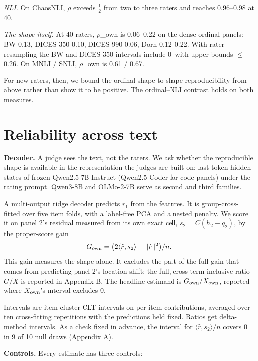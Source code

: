 \documentclass[10pt,twocolumn]{article}
\begin{document}
\emph{NLI.} On ChaosNLI, $\rho$ exceeds $\tfrac12$ from two to three raters and reaches 0.96--0.98 at 40.

\emph{The shape itself.} At 40 raters, $\rho$\_own is 0.06--0.22 on the dense ordinal panels: BW 0.13, DICES-350 0.10, DICES-990 0.06, Dorn 0.12--0.22. With rater resampling the BW and DICES-350 intervals include 0, with upper bounds $\leq$ 0.26. On MNLI / SNLI, $\rho$\_own is 0.61 / 0.67.

For new raters, then, we bound the ordinal shape-to-shape reproducibility from above rather than show it to be positive. The ordinal--NLI contrast holds on both measures.

\section{Reliability across text}


\textbf{Decoder.} A judge sees the text, not the raters. We ask whether the reproducible shape is available in the representation the judges are built on: last-token hidden states of frozen Qwen2.5-7B-Instruct (Qwen2.5-Coder for code panels) under the rating prompt. Qwen3-8B and OLMo-2-7B serve as second and third families.

A multi-output ridge decoder predicts \(r_1\) from the features. It is group-cross-fitted over five item folds, with a label-free PCA and a nested penalty. We score it on panel 2's residual measured from its own exact cell, \(s_2 = C(h_2-q_2)\), by the proper-score gain \[G_{\rm own} = \big(2\langle\hat r,s_2\rangle-\|\hat r\|^2\big)/n .\] This gain measures the shape alone. It excludes the part of the full gain that comes from predicting panel 2's location shift; the full, cross-term-inclusive ratio \(G/X\) is reported in Appendix B. The headline estimand is \(G_{\rm own}/X_{\rm own}\), reported where \(X_{\rm own}\)'s interval excludes 0.

Intervals are item-cluster CLT intervals on per-item contributions, averaged over ten cross-fitting repetitions with the predictions held fixed. Ratios get delta-method intervals. As a check fixed in advance, the interval for \(\langle\hat r,s_2\rangle/n\) covers 0 in 9 of 10 null draws (Appendix A).

\textbf{Controls.} Every estimate has three controls:
\end{document}
